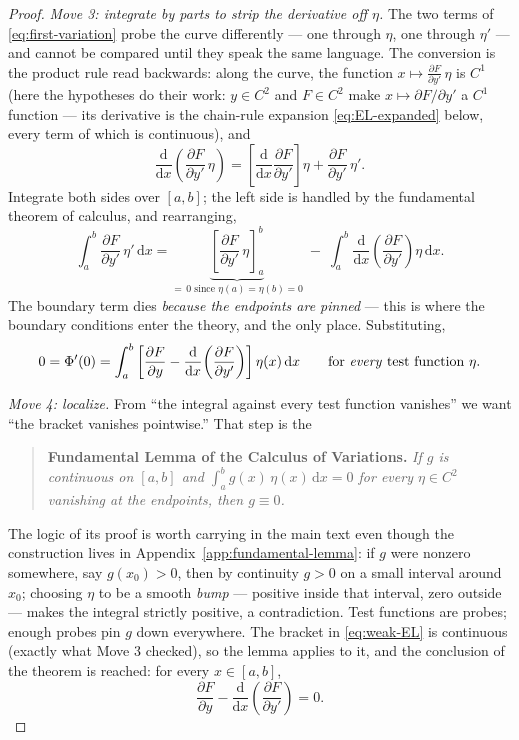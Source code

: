 \documentclass[11pt]{article}
\theoremstyle{plain}
\theoremstyle{definition}
\theoremstyle{remark}
\newcommand{\dd}{\mathrm{d}}
\newcommand{\pd}[2]{\frac{\partial #1}{\partial #2}}
\begin{document}
\begin{proof}
\emph{Move 3: integrate by parts to strip the derivative off $\eta$.}
The two terms of \eqref{eq:first-variation} probe the curve differently
--- one through $\eta$, one through $\eta'$ --- and cannot be compared
until they speak the same language. The conversion is the product rule
read backwards: along the curve, the function
$x \mapsto \tfrac{\partial F}{\partial y'}\,\eta$ is $C^1$ (here the
hypotheses do their work: $y \in C^2$ and $F \in C^2$ make
$x \mapsto \partial F/\partial y'$ a $C^1$ function --- its derivative is
the chain-rule expansion \eqref{eq:EL-expanded} below, every term of which
is continuous), and
\begin{equation}
  \frac{\dd}{\dd x}\!\left(\pd{F}{y'}\,\eta\right)
  = \left[\frac{\dd}{\dd x}\pd{F}{y'}\right]\eta
  + \pd{F}{y'}\,\eta' .
\end{equation}
Integrate both sides over $[a,b]$; the left side is handled by the
fundamental theorem of calculus, and rearranging,
\begin{equation}
  \int_a^b \pd{F}{y'}\,\eta'\,\dd x
  = \underbrace{\left[\pd{F}{y'}\,\eta\right]_a^b}_{=\,0
    \text{ since } \eta(a)=\eta(b)=0}
  \;-\; \int_a^b \frac{\dd}{\dd x}\!\left(\pd{F}{y'}\right)\eta\,\dd x .
\end{equation}
The boundary term dies \emph{because the endpoints are pinned} --- this is
where the boundary conditions enter the theory, and the only place.
Substituting,
\begin{equation}
  0 = \Phi'(0)
  = \int_a^b \left[\pd{F}{y} - \frac{\dd}{\dd x}\!\left(\pd{F}{y'}\right)\right]
  \eta(x)\,\dd x
  \qquad\text{for \emph{every} test function } \eta .
  \label{eq:weak-EL}
\end{equation}

\emph{Move 4: localize.}
From ``the integral against every test function vanishes'' we want ``the
bracket vanishes pointwise.'' That step is the

\begin{quote}
\textbf{Fundamental Lemma of the Calculus of Variations.}
\emph{If $g$ is continuous on $[a,b]$ and
$\int_a^b g(x)\,\eta(x)\,\dd x = 0$ for every $\eta\in C^2$ vanishing at
the endpoints, then $g \equiv 0$.}
\end{quote}

The logic of its proof is worth carrying in the main text even though the
construction lives in Appendix~\ref{app:fundamental-lemma}: if $g$ were
nonzero somewhere, say $g(x_0) > 0$, then by continuity $g > 0$ on a small
interval around $x_0$; choosing $\eta$ to be a smooth \emph{bump} ---
positive inside that interval, zero outside --- makes the integral strictly
positive, a contradiction. Test functions are probes; enough probes pin
$g$ down everywhere. The bracket in \eqref{eq:weak-EL} is continuous
(exactly what Move 3 checked), so the lemma applies to it, and the
conclusion of the theorem is reached: for every $x \in [a,b]$,
\begin{equation*}
  \boxed{\;
  \pd{F}{y} - \frac{\dd}{\dd x}\!\left(\pd{F}{y'}\right) = 0 .
  \;}
\end{equation*}
\end{proof}
\end{document}
